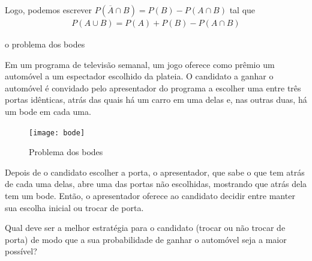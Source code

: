Logo, podemos escrever \(P(\overline{A}\cap B)=P(B)-P(A\cap B)\) tal que
\begin{equation*}
\begin{split}P(A\cup B)=P(A)+P(B)-P(A\cap B)\end{split}
\end{equation*}


\label{regrasbasicaspropriedades}\begin{task}{o problema dos bodes}


Em um programa de televisão semanal, um jogo oferece como prêmio um automóvel a um espectador escolhido da plateia. O candidato a ganhar o automóvel é convidado pelo apresentador do programa a escolher uma entre três portas idênticas, atrás das quais há um carro em uma delas e, nas outras duas, há um bode em cada uma.

\begin{figure}[H]
\centering

\noindent\texttt{[image: bode]}
\caption{Problema dos bodes}
\end{figure}


Depois de o candidato escolher a porta, o apresentador, que sabe o que tem atrás de cada uma delas, abre uma das portas não escolhidas, mostrando que atrás dela tem um bode. Então, o apresentador oferece ao candidato decidir entre manter sua escolha inicial ou trocar de porta.

Qual deve ser a melhor estratégia para o candidato (trocar ou não trocar de porta) de modo que a sua probabilidade de ganhar o automóvel seja a maior possível?
\end{task}
